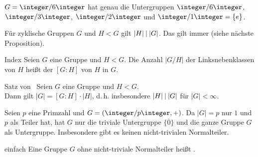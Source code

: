 \begin{Bsp}
    $G = \integer/6\integer$ hat genau die Untergruppen
    $\integer/6\integer$, $\integer/3\integer$, $\integer/2\integer$ und 
    $\integer/1\integer = \{e\}$.
\end{Bsp}

\begin{Bem}
    Für zyklische Gruppen $G$ und $H < G$ gilt $|H| \mathbin{|} |G|$.
    Das gilt immer (siehe nächste Proposition).
\end{Bem}

\linie

\begin{Def}{Index}
    Seien $G$ eine Gruppe und $H < G$.
    Die Anzahl $|G/H|$ der Linksnebenklassen von $H$ heißt der
     $[G:H]$ von $H$ in $G$.
\end{Def}

\begin{Prop}{Satz von \upshape\,\!}
    Seien $G$ eine Gruppe und $H < G$.\\
    Dann gilt $|G| = [G:H] \cdot |H|$, d.\,h.
    insbesondere $|H| \mathbin{|} |G|$ für $|G| < \infty$.
\end{Prop}

\begin{Bem}
    Seien $p$ eine Primzahl und $G = (\integer/p\integer, +)$.
    Da $|G| = p$ nur $1$ und $p$ als Teiler hat, hat $G$ nur die
    triviale Untergruppe $\{\overline{0}\}$ und die ganze Gruppe $G$
    als Untergruppe.
    Insbesondere gibt es keinen nicht-trivialen Normalteiler.
\end{Bem}

\begin{Def}{einfach}
    Eine Gruppe $G$ ohne nicht-triviale Normalteiler heißt .
\end{Def}

\linie
\pagebreak

